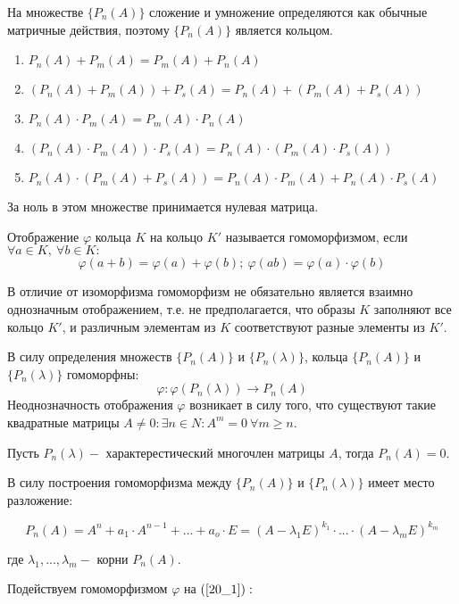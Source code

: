 \documentclass[a4paper, 12pt]{article}
\begin{document}
На множестве $\{P_n(A)\}$ сложение и умножение определяются как обычные матричные действия, поэтому $\{P_n(A)\}$ является кольцом.

\begin{enumerate}
	\item $P_n(A) + P_m(A) = P_m(A) + P_n(A)$
	\item $(P_n(A) + P_m(A)) + P_s(A) = P_n(A) + (P_m(A) + P_s(A))$
	\item $P_n(A) \cdot P_m(A) = P_m(A) \cdot P_n(A)$
	\item $(P_n(A) \cdot P_m(A)) \cdot P_s(A) = P_n(A) \cdot (P_m(A) \cdot P_s(A))$
	\item $P_n(A) \cdot (P_m(A) + P_s(A)) = P_n(A) \cdot P_m(A) + P_n(A) \cdot P_s(A)$
\end{enumerate}

За ноль в этом множестве принимается нулевая матрица.

\begin{definition}
Отображение $\varphi$ кольца $K$ на кольцо $K'$ называется гомоморфизмом, если $\forall a \in K,~ \forall b \in K:$
\[\varphi(a+b) = \varphi(a) + \varphi(b);~ \varphi(ab) = \varphi(a) \cdot \varphi(b)\] 
\end{definition}

В отличие от изоморфизма гомоморфизм не обязательно является взаимно однозначным отображением, т.е. не предполагается, что образы $K$ заполняют все кольцо $K'$, и различным элементам из $K$ соответствуют разные элементы из $K'$.

В силу определения множеств $\{P_n(A)\}$ и $\{P_n(\lambda)\}$, кольца $\{P_n(A)\}$ и $\{P_n(\lambda)\}$ гомоморфны:
\[\varphi: \varphi(P_n(\lambda)) \longrightarrow P_n(A)\]
Неоднозначность отображения $\varphi$ возникает в силу того, что существуют такие квадратные матрицы $A \neq 0: \exists n \in N: A^m = 0~ \forall m \geq n$.

\begin{theorem}
Пусть $P_n(\lambda) - $ характерестический многочлен матрицы $A$, тогда $P_n(A) = 0$.
\end{theorem}

В силу построения гомоморфизма между $\{P_n(A)\}$ и $\{P_n(\lambda)\}$ имеет место разложение:

\[P_n(A) = A^n + a_1 \cdot A^{n-1} + ... + a_o \cdot E = (A - \lambda_1 E)^{k_1} \cdot ... \cdot (A - \lambda_m E)^{k_m}\]

где $\lambda_1, ..., \lambda_m - $ корни $P_n(A)$.

Подействуем гомоморфизмом $\varphi$ на $(\ref{20_1}):$
\end{document}
